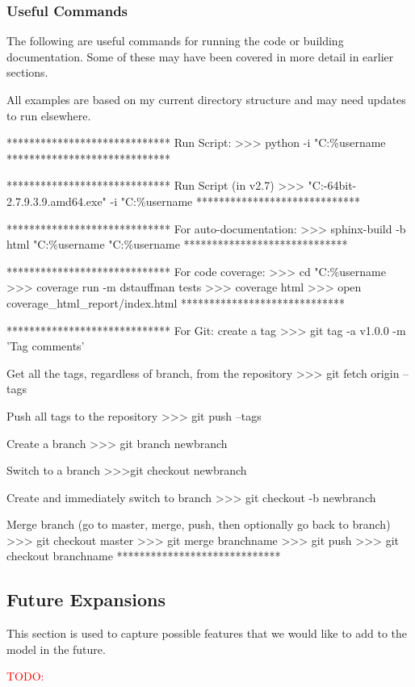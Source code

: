\documentclass[12pt]{article}
\begin{document}
\subsubsection{Useful Commands}\label{h3:useful_commands}
The following are useful commands for running the code or building documentation.  Some of these may have been covered in more detail in earlier sections.

\begin{PlainText}
All examples are based on my current directory structure and may need updates to run elsewhere.


*****************************
Run Script:
>>> python -i "C:\Users\%username%
*****************************


*****************************
Run Script (in v2.7)
>>> "C:\Programs\WinPython-64bit-2.7.9.3.9.amd64\python.exe"
 -i "C:\Users\%username%
*****************************


*****************************
For auto-documentation:
>>> sphinx-build -b html "C:\Users\%username%
 "C:\Users\%username%
*****************************


*****************************
For code coverage:
>>> cd "C:\Users\%username%
>>> coverage run -m dstauffman tests
>>> coverage html
>>> open coverage_html_report/index.html
*****************************

*****************************
For Git:
create a tag
>>> git tag -a v1.0.0 -m 'Tag comments'

Get all the tags, regardless of branch, from the repository
>>> git fetch origin --tags

Push all tags to the repository
>>> git push --tags

Create a branch
>>> git branch newbranch

Switch to a branch
>>>git checkout newbranch

Create and immediately switch to branch
>>> git checkout -b newbranch

Merge branch (go to master, merge, push, then optionally go back to branch)
>>> git checkout master
>>> git merge branchname
>>> git push
>>> git checkout branchname
*****************************
\end{PlainText}

\subsection{Future Expansions}\label{h2:Future_expansions}
This section is used to capture possible features that we would like to add to the model in the future.

\textcolor{red}{TODO:}
\end{document}
